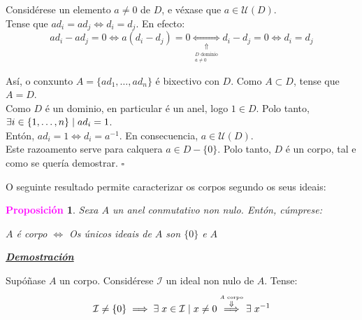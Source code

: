 \documentclass[twoside]{report}
\newcommand{\magbf}[1]{\textcolor{magenta}{\textbf{#1}}} %
\theoremstyle{mystyle}
\newtheorem{prop}{\magbf{Proposición}}[chapter]
\newenvironment{proposition}
{\begin{mdframed}[linecolor = magenta,backgroundcolor = classicrose, linewidth = 2mm]\begin{prop}}
{\end{prop}\end{mdframed}}
\begin{document}
\noindent Considérese un elemento $a \neq 0$ de $D$, e véxase que $a \in \mathcal{U}(D)$.\\

\noindent Tense que $ad_{i} = ad_{j} \Longleftrightarrow d_{i} = d_{j}$. En efecto:
$$ad_{i} - ad_{j} = 0 \Longleftrightarrow a(d_{i} - d_{j}) = 0 \underset{\underset{
\substack{
D \text{ dominio} \\ a \neq 0
}
}{\Uparrow}}{\Longleftrightarrow} d_{i} - d_{j} = 0 \Longleftrightarrow d_{i} = d_{j}$$

\noindent Así, o conxunto $A = \{ad_{1}, \ldots, ad_{n}\}$ é bixectivo con $D$. Como $A \subset D$, tense que $A = D$.\\

\noindent Como $D$ é un dominio, en particular é un anel, logo $1 \in D$. Polo tanto, $\exists i \in \{1, \ldots, n\} \hspace{1mm} | \hspace{1mm} ad_{i} = 1$. \\

\noindent Entón, $ad_{i} = 1 \Longleftrightarrow d_{i} = a^{-1}$. En consecuencia, $a \in \mathcal{U}(D)$.\\

\noindent Este razoamento serve para calquera $a \in D-\{0\}$. Polo tanto, $D$ é un corpo, tal e como se quería demostrar. $\square$ \\

\vspace{3mm}

\noindent O seguinte resultado permite caracterizar os corpos segundo os seus ideais:\\

\begin{proposition} \label{prop2.16}
Sexa $A$ un anel conmutativo non nulo. Entón, cúmprese:
\begin{center}
    $A$ é corpo $\Longleftrightarrow$ Os únicos ideais de $A$ son $\{0\}$ e $A$  
\end{center}
\end{proposition}

\vspace{2mm}

\noindent \textbf{\textit{\underline{Demostración}}}

\vspace{2mm}

\noindent {} Supóñase $A$ un corpo. Considérese $\mathcal{I}$ un ideal non nulo de $A$. Tense:
$$\mathcal{I} \neq \{0\} \implies \exists \hspace{1mm} x \in \mathcal{I} \hspace{1mm} | \hspace{1mm} x \neq 0 \overset{\overset{A \text{ corpo}}{\Downarrow}}{\implies} \exists \hspace{1mm} x^{-1}$$
\end{document}
